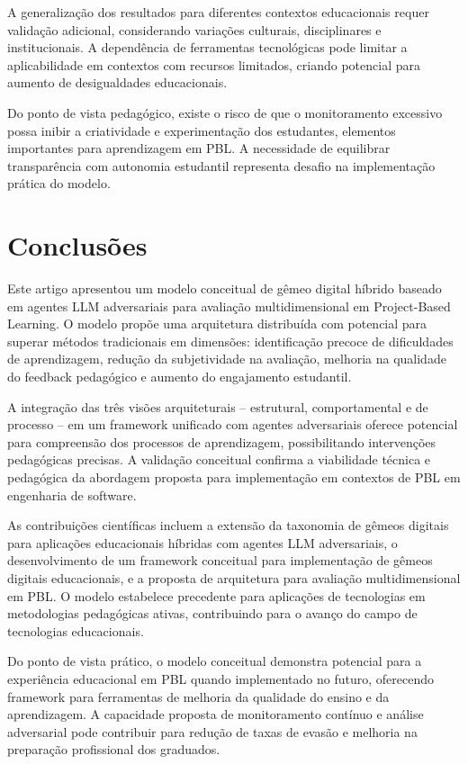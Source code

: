 \documentclass[english, spanish, brazilian]{modelo_dt}
\begin{document}
A generalização dos resultados para diferentes contextos educacionais requer validação adicional, considerando variações culturais, disciplinares e institucionais\@. A dependência de ferramentas tecnológicas pode limitar a aplicabilidade em contextos com recursos limitados, criando potencial para aumento de desigualdades educacionais\@.

Do ponto de vista pedagógico, existe o risco de que o monitoramento excessivo possa inibir a criatividade e experimentação dos estudantes, elementos importantes para aprendizagem em PBL\@. A necessidade de equilibrar transparência com autonomia estudantil representa desafio na implementação prática do modelo\@.

\section{Conclusões}

Este artigo apresentou um modelo conceitual de gêmeo digital híbrido baseado em agentes LLM adversariais para avaliação multidimensional em Project-Based Learning\@. O modelo propõe uma arquitetura distribuída com potencial para superar métodos tradicionais em dimensões: identificação precoce de dificuldades de aprendizagem, redução da subjetividade na avaliação, melhoria na qualidade do feedback pedagógico e aumento do engajamento estudantil\@.

A integração das três visões arquiteturais -- estrutural, comportamental e de processo -- em um framework unificado com agentes adversariais oferece potencial para compreensão dos processos de aprendizagem, possibilitando intervenções pedagógicas precisas\@. A validação conceitual confirma a viabilidade técnica e pedagógica da abordagem proposta para implementação em contextos de PBL em engenharia de software\@.

As contribuições científicas incluem a extensão da taxonomia de gêmeos digitais para aplicações educacionais híbridas com agentes LLM adversariais, o desenvolvimento de um framework conceitual para implementação de gêmeos digitais educacionais, e a proposta de arquitetura para avaliação multidimensional em PBL\@. O modelo estabelece precedente para aplicações de tecnologias em metodologias pedagógicas ativas, contribuindo para o avanço do campo de tecnologias educacionais\@.

Do ponto de vista prático, o modelo conceitual demonstra potencial para a experiência educacional em PBL quando implementado no futuro, oferecendo framework para ferramentas de melhoria da qualidade do ensino e da aprendizagem\@. A capacidade proposta de monitoramento contínuo e análise adversarial pode contribuir para redução de taxas de evasão e melhoria na preparação profissional dos graduados\@.
\end{document}
